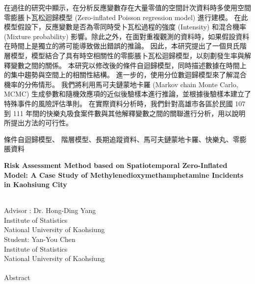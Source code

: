 \documentclass[12pt,a4paper]{article}
\begin{document}
\begin{CJK}{UTF8}{bkai}
\date{}

\noindent
\fontsize{12}{19pt}\selectfont
在過往的研究中顯示，在分析反應變數存在大量零值的空間計次資料時多使用空間零膨脹卜瓦松迴歸模型 (Zero-inflated Poisson regression model) 進行建模。
在此模型假設下，反應變數是否為零同時受卜瓦松過程的強度 (Intensity) 和混合機率 (Mixture probability) 影響。除此之外，在面對重複觀測的資料時，如果假設資料在時間上是獨立的將可能導致做出錯誤的推論。
因此，本研究提出了一個貝氏階層模型，模型結合了具有時空相關性的零膨脹卜瓦松迴歸模型，以刻劃發生率與解釋變數之間的關係。
本研究以修改後的條件自迴歸模型，同時描述數據在時間上的集中趨勢與空間上的相關性結構。
進一步的，使用分位數迴歸模型來了解混合機率的分佈情形。
我們將利用馬可夫鏈蒙地卡羅 (Markov chain Monte Carlo, MCMC) 生成參數和隨機效應項的近似後驗樣本進行推論，並根據後驗樣本建立了特殊事件的風險評估準則。
在實際資料分析時，我們針對高雄市各區於民國 107 到 111 年間的快樂丸吸食案件數與其他解釋變數之間的關聯進行分析，用以說明所提出方法的可行性。


 條件自迴歸模型、 階層模型、長期追蹤資料、馬可夫鏈蒙地卡羅、快樂丸、零膨脹資料

\newpage
\begin{center}
    \Large\textbf
    {Risk Assessment Method based on Spatiotemporal Zero-Inflated Model: A Case Study of Methylenedioxymethamphetamine Incidents in Kaohsiung City}

    ~\\[10pt]
    \normalsize
    Advisor :  Dr. Hong-Ding Yang
    \\[8pt]
    \small
    Institute of Statistics\\
    National University of Kaohsiung
    \\[10pt]
    \normalsize
    Student: Yan-You Chen
    \\[8pt]
    \small
    Institute of Statistics\\
    National University of Kaohsiung
    \\ \hspace*{\fill} \\
    {\Large Abstract}
\end{center}

\date{}


\end{CJK}
\end{document}
